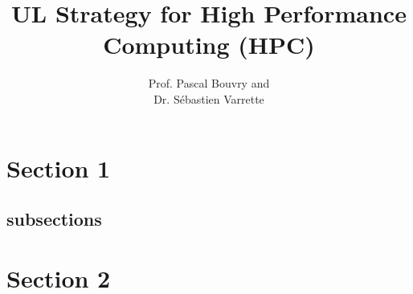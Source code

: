 \documentclass{article}
\title{UL Strategy for High Performance Computing (HPC)}
\author{%
  Prof. Pascal Bouvry and\\
  Dr. S\'ebastien Varrette
}
\begin{document}
\coverpages




\section{Section 1}

\lipsum[1]

\subsection{subsections}

\lipsum[2]

\section{Section 2}

\lipsum[2-8]
\end{document}

